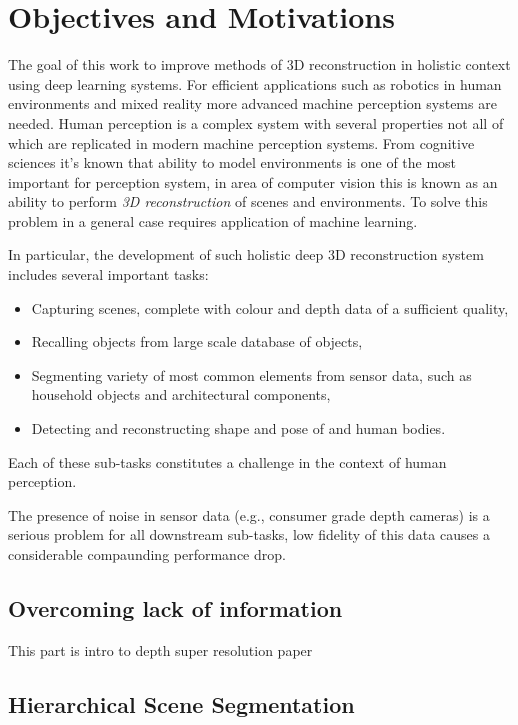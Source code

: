 \section{Objectives and Motivations}

The goal of this work to improve methods of 3D reconstruction in holistic context using deep learning systems. For efficient applications such as robotics in human environments and mixed reality more advanced machine perception systems are needed. Human perception is a complex system with several properties not all of which are replicated in modern machine perception systems. From cognitive sciences it's known that ability to model environments is one of the most important for perception system, in area of computer vision this is known as an ability to perform \textit{3D reconstruction} of scenes and environments. To solve this problem in a general case requires application of machine learning.

In particular, the development of such holistic deep 3D reconstruction system includes several important tasks:

\begin{itemize}
	\item Capturing scenes, complete with colour and depth data of a sufficient quality,
    \item Recalling objects from large scale database of objects,
    \item Segmenting variety of most common elements from sensor data, such as household objects and architectural components,
    \item Detecting and reconstructing shape and pose of and human bodies.
\end{itemize}

Each of these sub-tasks constitutes a challenge in the context of human perception.

The presence of noise in sensor data (e.g., consumer grade depth cameras) is a serious problem for all downstream sub-tasks, low fidelity of this data causes a considerable compaunding performance drop.

\subsection{Overcoming lack of information}

This part is intro to depth super resolution paper

\subsection{Hierarchical Scene Segmentation}

